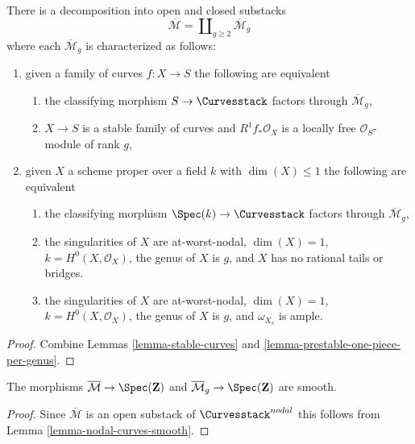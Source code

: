 \begin{lemma}
\label{lemma-stable-one-piece-per-genus}
There is a decomposition into open and closed substacks
$$
\overline{\mathcal{M}} = \coprod\nolimits_{g \geq 2} \overline{\mathcal{M}}_g
$$
where each $\overline{\mathcal{M}}_g$ is characterized as follows:
\begin{enumerate}
\item given a family of curves $f : X \to S$ the following are equivalent
\begin{enumerate}
\item the classifying morphism $S \to \Curvesstack$ factors
through $\overline{\mathcal{M}}_g$,
\item $X \to S$ is a stable family of curves and
$R^1f_*\mathcal{O}_X$ is a locally free $\mathcal{O}_S$-module of rank $g$,
\end{enumerate}
\item given $X$ a scheme proper over a field $k$ with
$\dim(X) \leq 1$ the following are equivalent
\begin{enumerate}
\item the classifying morphism $\Spec(k) \to \Curvesstack$
factors through $\overline{\mathcal{M}}_g$,
\item the singularities of $X$ are at-worst-nodal, $\dim(X) = 1$,
$k = H^0(X, \mathcal{O}_X)$, the genus of $X$ is $g$, and $X$
has no rational tails or bridges.
\item the singularities of $X$ are at-worst-nodal, $\dim(X) = 1$,
$k = H^0(X, \mathcal{O}_X)$, the genus of $X$ is $g$, and
$\omega_{X_s}$ is ample.
\end{enumerate}
\end{enumerate}
\end{lemma}

\begin{proof}
Combine Lemmas \ref{lemma-stable-curves} and
\ref{lemma-prestable-one-piece-per-genus}.
\end{proof}

\begin{lemma}
\label{lemma-stable-curves-smooth}
The morphisms
$\overline{\mathcal{M}} \to \Spec(\mathbf{Z})$ and
$\overline{\mathcal{M}}_g \to \Spec(\mathbf{Z})$
are smooth.
\end{lemma}

\begin{proof}
Since $\overline{\mathcal{M}}$ is an open substack of
$\Curvesstack^{nodal}$ this follows from
Lemma \ref{lemma-nodal-curves-smooth}.
\end{proof}




